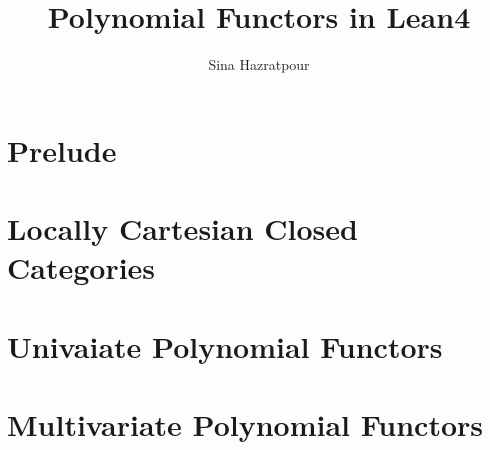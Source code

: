 
\title{Polynomial Functors in Lean4}
\author{Sina Hazratpour}


\maketitle

\setcounter{chapter}{-1}
\chapter{Prelude}

\chapter{Locally Cartesian Closed Categories}

\chapter{Univaiate Polynomial Functors}

\chapter{Multivariate Polynomial Functors}


% 


